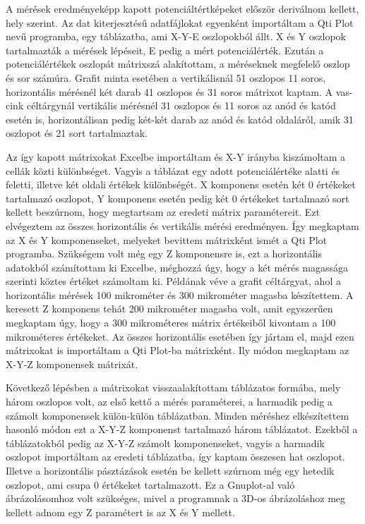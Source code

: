 A mérések eredményeképp kapott potenciáltértképeket először deriválnom kellett, hely szerint. Az dat kiterjesztésű adatfájlokat egyenként importáltam a Qti Plot nevű programba, egy táblázatba, ami X-Y-E oszlopokból állt. X és Y oszlopok tartalmazták a mérések lépéseit, E pedig a mért potenciálérték. Ezután a potenciálértékek oszlopát mátrixszá alakítottam, a méréseknek megfelelő oszlop és sor számúra. Grafit minta esetében a vertikálisnál 51 oszlopos 11 soros, horizontális mérésnél két darab 41 oszlopos és 31 soros mátrixot kaptam. A vas-cink céltárgynál vertikális mérésnél 31 oszlopos és 11 soros az anód és katód esetén is, horizontálisan pedig két-két darab az anód és katód oldaláról, amik 31 oszlopot és 21 sort tartalmaztak. 

Az így kapott mátrixokat Excelbe importáltam és X-Y irányba kiszámoltam a cellák közti különbséget. Vagyis a táblázat egy adott potenciálértéke alatti és feletti, illetve két oldali értékek különbségét. X komponens esetén két 0 értékeket tartalmazó oszlopot, Y komponens esetén pedig két 0 értékeket tartalmazó sort kellett beszúrnom, hogy megtartsam az eredeti mátrix paramétereit. Ezt elvégeztem az összes horizontális és vertikális mérési eredményen. Így megkaptam az X és Y komponenseket, melyeket bevittem mátrixként ismét a Qti Plot programba. Szükségem volt még egy Z komponensre is, ezt a horizontális adatokból számítottam ki Excelbe, méghozzá úgy, hogy a két mérés magassága szerinti köztes értéket számoltam ki. Példának véve a grafit céltárgyat, ahol a horizontális mérések 100 mikrométer és 300 mikrométer magasba készítettem. A keresett Z komponens tehát 200 mikrométer magasba volt, amit egyszerűen megkaptam úgy, hogy a 300 mikrométeres mátrix értékeiből kivontam a 100 mikrométeres értékeket. Az összes horizontális esetében így jártam el, majd ezen mátrixokat is importáltam a Qti Plot-ba mátrixként. Ily módon megkaptam az X-Y-Z komponensek mátrixát.

Következő lépésben a mátrixokat visszaalakítottam táblázatos formába, mely három oszlopos volt, az első kettő a mérés paraméterei, a harmadik pedig a számolt komponensek külön-külön táblázatban. Minden méréshez elkészítettem hasonló módon ezt a X-Y-Z komponenst tartalmazó három táblázatot. Ezekből a táblázatokból pedig az X-Y-Z számolt komponenseket, vagyis a harmadik oszlopot importáltam az eredeti táblázatba, így kaptam összesen hat oszlopot. Illetve a horizontális pásztázások esetén be kellett szúrnom még egy hetedik oszlopot, ami csupa 0 értékeket tartalmazott. Ez a Gnuplot-al való ábrázolásomhoz volt szükséges, mivel a programnak a 3D-os ábrázoláshoz meg kellett adnom egy Z paramétert is az X és Y mellett. 

